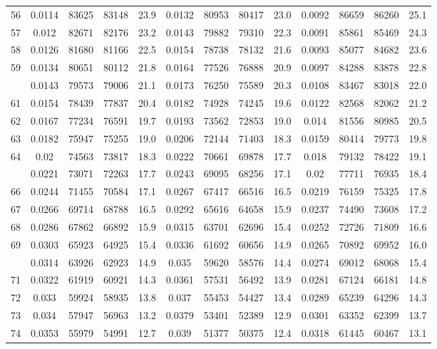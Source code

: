 \documentclass[
  14pt,
]{article}
\begin{document}
\begin{longtable}[t]{lcccccccccccc}
56 & 0.0114 & 83625 & 83148 & 23.9 & 0.0132 & 80953 & 80417 & 23.0 & 0.0092 & 86659 & 86260 & 25.1\\
57 & 0.012 & 82671 & 82176 & 23.2 & 0.0143 & 79882 & 79310 & 22.3 & 0.0091 & 85861 & 85469 & 24.3\\
58 & 0.0126 & 81680 & 81166 & 22.5 & 0.0154 & 78738 & 78132 & 21.6 & 0.0093 & 85077 & 84682 & 23.6\\
59 & 0.0134 & 80651 & 80112 & 21.8 & 0.0164 & 77526 & 76888 & 20.9 & 0.0097 & 84288 & 83878 & 22.8\\
\addlinespace
60 & 0.0143 & 79573 & 79006 & 21.1 & 0.0173 & 76250 & 75589 & 20.3 & 0.0108 & 83467 & 83018 & 22.0\\
61 & 0.0154 & 78439 & 77837 & 20.4 & 0.0182 & 74928 & 74245 & 19.6 & 0.0122 & 82568 & 82062 & 21.2\\
62 & 0.0167 & 77234 & 76591 & 19.7 & 0.0193 & 73562 & 72853 & 19.0 & 0.014 & 81556 & 80985 & 20.5\\
63 & 0.0182 & 75947 & 75255 & 19.0 & 0.0206 & 72144 & 71403 & 18.3 & 0.0159 & 80414 & 79773 & 19.8\\
64 & 0.02 & 74563 & 73817 & 18.3 & 0.0222 & 70661 & 69878 & 17.7 & 0.018 & 79132 & 78422 & 19.1\\
\addlinespace
65 & 0.0221 & 73071 & 72263 & 17.7 & 0.0243 & 69095 & 68256 & 17.1 & 0.02 & 77711 & 76935 & 18.4\\
66 & 0.0244 & 71455 & 70584 & 17.1 & 0.0267 & 67417 & 66516 & 16.5 & 0.0219 & 76159 & 75325 & 17.8\\
67 & 0.0266 & 69714 & 68788 & 16.5 & 0.0292 & 65616 & 64658 & 15.9 & 0.0237 & 74490 & 73608 & 17.2\\
68 & 0.0286 & 67862 & 66892 & 15.9 & 0.0315 & 63701 & 62696 & 15.4 & 0.0252 & 72726 & 71809 & 16.6\\
69 & 0.0303 & 65923 & 64925 & 15.4 & 0.0336 & 61692 & 60656 & 14.9 & 0.0265 & 70892 & 69952 & 16.0\\
\addlinespace
70 & 0.0314 & 63926 & 62923 & 14.9 & 0.035 & 59620 & 58576 & 14.4 & 0.0274 & 69012 & 68068 & 15.4\\
71 & 0.0322 & 61919 & 60921 & 14.3 & 0.0361 & 57531 & 56492 & 13.9 & 0.0281 & 67124 & 66181 & 14.8\\
72 & 0.033 & 59924 & 58935 & 13.8 & 0.037 & 55453 & 54427 & 13.4 & 0.0289 & 65239 & 64296 & 14.3\\
73 & 0.034 & 57947 & 56963 & 13.2 & 0.0379 & 53401 & 52389 & 12.9 & 0.0301 & 63352 & 62399 & 13.7\\
74 & 0.0353 & 55979 & 54991 & 12.7 & 0.039 & 51377 & 50375 & 12.4 & 0.0318 & 61445 & 60467 & 13.1\\

\end{longtable}
\end{document}
